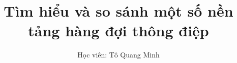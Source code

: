 \documentclass[a4paper, 14pt]{article} %
\begin{document}
\title{Tìm hiểu và so sánh một số nền tảng hàng đợi thông điệp}
\author{Học viên: Tô Quang Minh}
\maketitle
\justify







\end{document}
